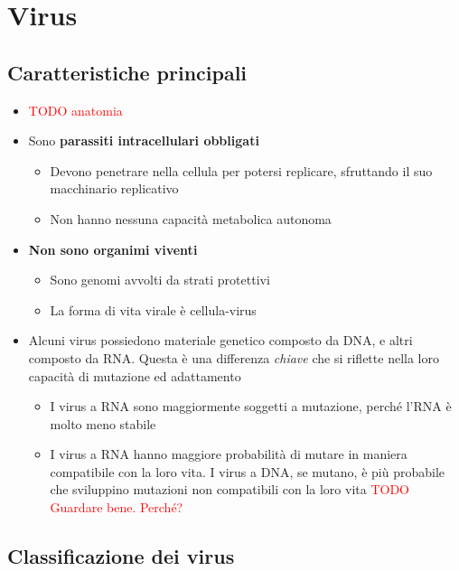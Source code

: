 \documentclass[italian,]{article}
\providecommand{\tightlist}{%
  \setlength{\itemsep}{0pt}\setlength{\parskip}{0pt}}
\newcommand{\TODO}[1]{\textcolor{red}{\textsf{\footnotesize{TODO #1}}}} %
\begin{document}
\hypertarget{virus}{%
\section{Virus}\label{virus}}

\hypertarget{caratteristiche-principali}{%
\subsection{Caratteristiche
principali}\label{caratteristiche-principali}}

\begin{itemize}
\item
  \TODO{anatomia}
\item
  Sono \textbf{parassiti intracellulari obbligati}

  \begin{itemize}
  \tightlist
  \item
    Devono penetrare nella cellula per potersi replicare, sfruttando il
    suo macchinario replicativo
  \item
    Non hanno nessuna capacità metabolica autonoma
  \end{itemize}
\item
  \textbf{Non sono organimi viventi}

  \begin{itemize}
  \tightlist
  \item
    Sono genomi avvolti da strati protettivi
  \item
    La forma di vita virale è cellula-virus
  \end{itemize}
\item
  Alcuni virus possiedono materiale genetico composto da DNA, e altri
  composto da RNA. Questa è una differenza \emph{chiave} che si riflette
  nella loro capacità di mutazione ed adattamento

  \begin{itemize}
  \tightlist
  \item
    I virus a RNA sono maggiormente soggetti a mutazione, perché l'RNA è
    molto meno stabile
  \item
    I virus a RNA hanno maggiore probabilità di mutare in maniera
    compatibile con la loro vita. I virus a DNA, se mutano, è più
    probabile che sviluppino mutazioni non compatibili con la loro vita
    \TODO{Guardare bene. Perché?}
  \end{itemize}
\end{itemize}

\hypertarget{classificazione-dei-virus}{%
\subsection{Classificazione dei virus}\label{classificazione-dei-virus}}
\end{document}
